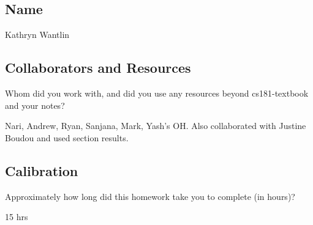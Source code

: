\documentclass[submit]{harvardml}
\begin{document}
\newpage
\subsection*{Name}

Kathryn Wantlin

\subsection*{Collaborators and Resources}
Whom did you work with, and did you use any resources beyond cs181-textbook and your notes?

Nari, Andrew, Ryan, Sanjana, Mark, Yash's OH. Also collaborated with Justine Boudou and used section results.

\subsection*{Calibration}
Approximately how long did this homework take you to complete (in hours)? 

15 hrs
\end{document}
